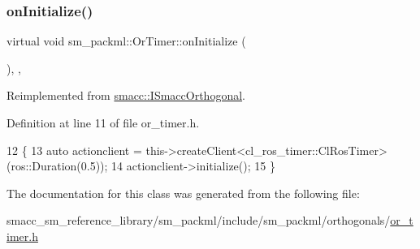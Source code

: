 \subsubsection{\texorpdfstring{on\+Initialize()}{onInitialize()}}
{\footnotesize\ttfamily virtual void sm\+\_\+packml\+::\+Or\+Timer\+::on\+Initialize (\begin{DoxyParamCaption}{ }\end{DoxyParamCaption})\hspace{0.3cm}{\ttfamily [inline]}, {\ttfamily [override]}, {\ttfamily [virtual]}}



Reimplemented from \hyperlink{classsmacc_1_1ISmaccOrthogonal_a6bb31c620cb64dd7b8417f8705c79c7a}{smacc\+::\+I\+Smacc\+Orthogonal}.



Definition at line 11 of file or\+\_\+timer.\+h.


\begin{DoxyCode}
12     \{
13         \textcolor{keyword}{auto} actionclient = this->createClient<cl\_ros\_timer::ClRosTimer>(ros::Duration(0.5));
14         actionclient->initialize();
15     \}
\end{DoxyCode}


The documentation for this class was generated from the following file\+:\begin{DoxyCompactItemize}
\item 
smacc\+\_\+sm\+\_\+reference\+\_\+library/sm\+\_\+packml/include/sm\+\_\+packml/orthogonals/\hyperlink{sm__packml_2include_2sm__packml_2orthogonals_2or__timer_8h}{or\+\_\+timer.\+h}\end{DoxyCompactItemize}
